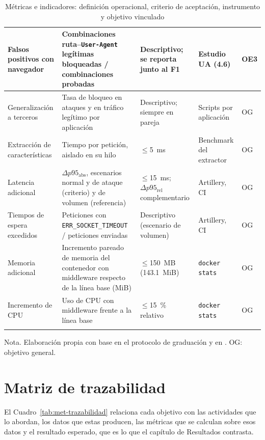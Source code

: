 \begin{longtable}{|L{2.8cm}|L{4.0cm}|L{2.7cm}|L{2.0cm}|L{1.0cm}|}
Falsos positivos con navegador & Combinaciones ruta--\texttt{User-Agent} legítimas bloqueadas / combinaciones probadas & Descriptivo; se reporta junto al F1 & Estudio UA (4.6) & OE3 \\ \hline
Generalización a terceros & Tasa de bloqueo en ataques y en tráfico legítimo por aplicación & Descriptivo; siempre en pareja & Scripts por aplicación & OG \\ \hline
Extracción de características & Tiempo por petición, aislado en su hilo & $\leq$5~ms & Benchmark del extractor & OG \\ \hline
Latencia adicional & $\Delta p95_{\mathrm{abs}}$, escenarios normal y de ataque (criterio) y de volumen (referencia) & $\leq$15~ms; $\Delta p95_{\mathrm{rel}}$ complementario & Artillery, CI & OG \\ \hline
Tiempos de espera excedidos & Peticiones con \texttt{ERR\_SOCKET\_TIMEOUT} / peticiones enviadas & Descriptivo (escenario de volumen) & Artillery, CI & OG \\ \hline
Memoria adicional & Incremento pareado de memoria del contenedor con middleware respecto de la línea base (MiB) & $\leq$150~MB (143.1~MiB) & \texttt{docker stats} & OG \\ \hline
Incremento de CPU & Uso de CPU con middleware frente a la línea base & $\leq$15~\% relativo & \texttt{docker stats} & OG \\ \hline
\caption[Métricas e indicadores de evaluación]{Métricas e indicadores: definición operacional, criterio de aceptación, instrumento y objetivo vinculado}
\label{tab:met-metricas}
\end{longtable}
{\footnotesize Nota. Elaboración propia con base en el protocolo de graduación y en
\cite{fawcett2006}. OG: objetivo general.}

\section{Matriz de trazabilidad}
\label{sec:met-trazabilidad}

El Cuadro~\ref{tab:met-trazabilidad} relaciona cada objetivo con las actividades que lo
abordan, los datos que estas producen, las métricas que se calculan sobre esos datos y el
resultado esperado, que es lo que el capítulo de Resultados contrasta.

